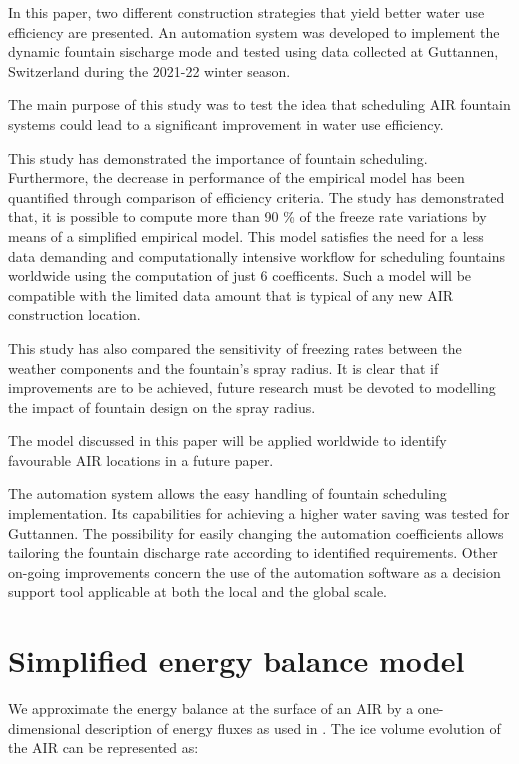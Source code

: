 \documentclass[tc, manuscript]{copernicus}
\begin{document}
\conclusions

In this paper, two different construction strategies that yield better water use efficiency are presented.
An automation system was developed to implement the dynamic fountain sischarge mode and tested using data
collected at Guttannen, Switzerland during the 2021-22 winter season. 

The main purpose of this study was to test the idea that scheduling AIR fountain systems could lead to a
significant improvement in water use efficiency.

This study has demonstrated the importance of fountain scheduling. Furthermore, the decrease in performance of
the empirical model has been quantified through comparison of efficiency criteria. The study has demonstrated
that, it is possible to compute more than 90 \% of the freeze rate variations by means of a simplified empirical
model. This model satisfies the need for a less data demanding and computationally intensive workflow for
scheduling fountains worldwide using the computation of just 6 coefficents. Such a model will be compatible with
the limited data amount that is typical of any new AIR construction location.

This study has also compared the sensitivity of freezing rates between the weather components and the fountain's
spray radius. It is clear that if improvements are to be achieved, future research must be devoted to modelling
the impact of fountain design on the spray radius.

The model discussed in this paper will be applied worldwide to identify favourable AIR locations in a future
paper.


The automation system allows the easy handling of fountain scheduling implementation. Its capabilities for
achieving a higher water saving was tested for Guttannen. The possibility for easily changing the automation
coefficients allows tailoring the fountain discharge rate according to identified requirements. Other on-going
improvements concern the use of the automation software as a decision support tool applicable at both the local
and the global scale.



\appendix

\section{Simplified energy balance model}

We approximate the energy balance at the surface of an AIR by a one-dimensional description of energy fluxes as
used in \cite{balasubramanianInfluenceMeteorologicalConditions2022}. The ice volume evolution of the AIR can be
represented as: 
\end{document}
